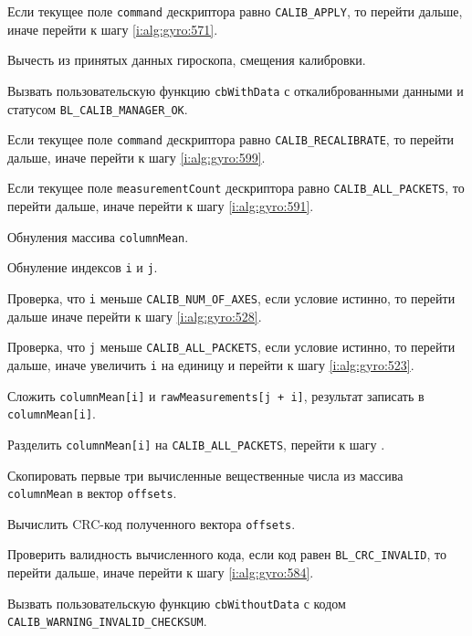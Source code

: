 \begin{enumerate_step}
    \item \label{i:alg:gyro:566} Если текущее поле \lstinline|command| дескриптора равно \lstinline|CALIB_APPLY|, то перейти дальше, иначе перейти к шагу
    \ref{i:alg:gyro:571}.
    \item Вычесть из принятых данных гироскопа, смещения калибровки.
    \item Вызвать пользовательскую функцию \lstinline|cbWithData| с откалиброванными данными и статусом \lstinline|BL_CALIB_MANAGER_OK|.

    \item \label{i:alg:gyro:571} Если текущее поле \lstinline|command| дескриптора равно \lstinline|CALIB_RECALIBRATE|, то перейти дальше, иначе перейти к шагу
    \ref{i:alg:gyro:599}.
    \item \label{i:alg:gyro:573} Если текущее поле \lstinline|measurementCount| дескриптора равно \lstinline|CALIB_ALL_PACKETS|, то перейти дальше, иначе перейти к шагу
    \ref{i:alg:gyro:591}.
    \item Обнуления массива \lstinline|columnMean|.
    \item Обнуление индексов \lstinline|i| и \lstinline|j|.
    \item \label{i:alg:gyro:517} Проверка, что \lstinline|i| меньше \lstinline|CALIB_NUM_OF_AXES|, если условие истинно, то перейти дальше иначе перейти к шагу \ref{i:alg:gyro:528}.
    \item Проверка, что \lstinline|j| меньше \lstinline|CALIB_ALL_PACKETS|, если условие истинно, то перейти дальше, иначе увеличить \lstinline|i| на единицу и перейти к шагу \ref{i:alg:gyro:523}.
    \item Сложить \lstinline|columnMean[i]| и \lstinline|rawMeasurements[j + i]|, результат записать в \lstinline|columnMean[i]|.
    \item \label{i:alg:gyro:523} Разделить \lstinline|columnMean[i]| на \lstinline|CALIB_ALL_PACKETS|, перейти к шагу \label{i:alg:gyro:517}.
    \item \label{i:alg:gyro:528} Скопировать первые три вычисленные вещественные числа из массива \lstinline|columnMean| в вектор \lstinline|offsets|.
    \item Вычислить CRC-код полученного вектора \lstinline|offsets|.
    \item Проверить валидность вычисленного кода, если код равен \lstinline|BL_CRC_INVALID|, то перейти дальше, иначе перейти к шагу \ref{i:alg:gyro:584}.
    \item Вызвать пользовательскую функцию \lstinline|cbWithoutData| с кодом \lstinline|CALIB_WARNING_INVALID_CHECKSUM|.

\end{enumerate_step}
